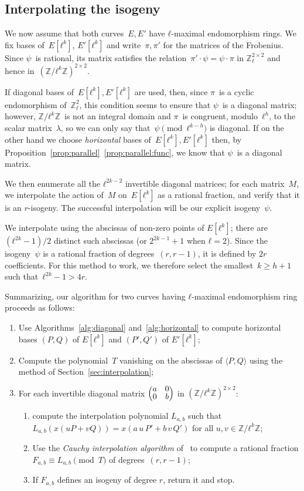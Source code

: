 \documentclass{lms}
\def\mat#1{\begin{pmatrix}#1\end{pmatrix}}
\def\smat#1{{\def\arraystretch{.7}\mat{#1}}}
\begin{document}
\subsection{Interpolating the isogeny}
\label{sub:final-interp}

We now assume that both curves~$E, E'$
have $ℓ$-maximal endomorphism rings.
We fix bases of~$E[ℓ^k]$, $E'[ℓ^k]$ and write~$π, π'$ for the matrices
of the Frobenius.
Since $ψ$~is rational, its matrix satisfies the relation~$π' · ψ = ψ · π$
in $ℤ_ℓ^{2×2}$ and hence in~$(ℤ/ℓ^k ℤ)^{2 × 2}$.

If diagonal bases of~$E[ℓ^k], E'[ℓ^k]$ are used, then,
since $π$~is a cyclic endomorphism of~$ℤ_ℓ^2$,
this condition seems to ensure that $ψ$~is a diagonal matrix;
however, $ℤ/ℓ^k ℤ$~is not an integral domain
and $π$~is congruent, modulo~$ℓ^h$, to the scalar matrix~$λ$,
so we can only say that~$ψ\pmod{ℓ^{k-h}}$ is diagonal.
If on the other hand we choose \emph{horizontal} bases
of~$E[ℓ^k], E'[ℓ^k]$ then, by Proposition~\ref{prop:parallel}~\ref{prop:parallel:func},
we know that $ψ$~is a diagonal matrix.

We then enumerate all the $ℓ^{2k-2}$ invertible diagonal matrices; for
each matrix~$M$, we interpolate the action of~$M$ on~$E[ℓ^k]$ as a
rational fraction, and verify that it is an $r$-isogeny. The
successful interpolation will be our explicit isogeny~$ψ$.

We interpolate using the abscissas of non-zero points of $E[ℓ^k]$;
there are $(ℓ^{2k}-1)/2$ distinct such abscissas (or $2^{2k-1}+1$ when
$ℓ=2$).  Since the isogeny~$ψ$ is a rational fraction of
degrees~$(r, r-1)$, it is defined by $2r$ coefficients.  For this
method to work, we therefore select the smallest~$k ≥ h+1$ such
that~$ℓ^{2k}-1 > 4r$.

Summarizing, our algorithm for two curves having $ℓ$-maximal
endomorphism ring proceeds as follows:
\begin{enumerate}
\item\label{alg:ours:horizontal} Use Algorithms~\ref{alg:diagonal}
  and~\ref{alg:horizontal} to compute horizontal bases $(P,Q)$ of
  $E[ℓ^k]$ and $(P',Q')$ of $E'[ℓ^k]$;
\item\label{alg:ours:T} Compute the polynomial~$T$ vanishing
  on the abscissas of $\langle P,Q\rangle$ using the method of
  Section~\ref{sec:interpolation};
\item\label{alg:ours:for} For each invertible diagonal matrix
  $\smat{a&0\\0&b}$ in $(ℤ/ℓ^k ℤ)^{2×2}$:
  \begin{enumerate}
  \item\label{alg:ours:interp} compute the interpolation polynomial
    $L_{a,b}$ such that
    $L_{a,b} (x (u P + v Q)) = x(a\, u\,P' + b\,v\, Q')$ for all
    $u, v ∈ ℤ/ℓ^k ℤ$;
  \item\label{alg:ours:cauchy} Use the \emph{Cauchy interpolation
      algorithm} of~\cite[Chapter~5.8]{vzGG} to compute a rational
    fraction $F_{a,b}≡L_{a,b}\pmod{T}$ of degrees~$(r, r-1)$;
  \item If $F_{a,b}$ defines an isogeny of degree $r$, return it and
    stop.
  \end{enumerate}
\end{enumerate}
\end{document}
